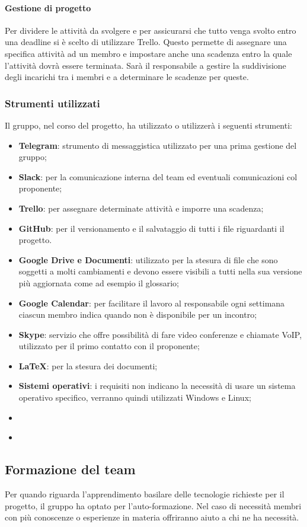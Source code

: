 			\paragraph{Gestione di progetto}
			Per dividere le attività da svolgere e per assicurarsi che tutto venga svolto entro una deadline si è scelto di utilizzare Trello. Questo permette di assegnare una specifica attività ad un membro e impostare anche una scadenza entro la quale l'attività dovrà essere terminata. Sarà il responsabile a gestire la suddivisione degli incarichi tra i membri e a determinare le scadenze per queste.
		\subsubsection{Strumenti utilizzati}
		Il gruppo, nel corso del progetto, ha utilizzato o utilizzerà i seguenti strumenti:
		\begin{itemize}
			\item \textbf{Telegram}: strumento di messaggistica utilizzato per una prima gestione del gruppo;
			\item \textbf{Slack}: per la comunicazione interna del team ed eventuali comunicazioni col proponente;
			\item \textbf{Trello}: per assegnare determinate attività e imporre una scadenza;
			\item \textbf{GitHub}: per il versionamento e il salvataggio di tutti i file riguardanti il progetto.
			\item \textbf{Google Drive e Documenti}: utilizzato per la stesura di file che sono soggetti a molti cambiamenti e devono essere visibili a tutti nella sua versione più aggiornata come ad esempio il glossario;
			\item \textbf{Google Calendar}: per facilitare il lavoro al responsabile ogni settimana ciascun membro indica quando non è disponibile per un incontro;
			\item \textbf{Skype}: servizio che offre possibilità di fare video conferenze e chiamate VoIP, utilizzato per il primo contatto con il proponente;
			\item \textbf{\LaTeX}: per la stesura dei documenti;
			\item \textbf{Sistemi operativi}: i requisiti non indicano la necessità di usare un sistema operativo specifico, verranno quindi utilizzati Windows e Linux; %
			\item \textbf{} %
			\item \textbf{} %
		\end{itemize}
	\subsection{Formazione del team}
	Per quando riguarda l'apprendimento basilare delle tecnologie richieste per il progetto, il gruppo ha optato per l'auto-formazione. Nel caso di necessità membri con più conoscenze o esperienze in materia offriranno aiuto a chi ne ha necessità.			